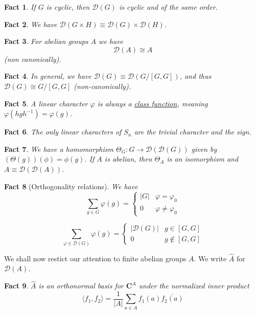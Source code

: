 \documentclass[12pt]{article}
\newtheorem*{fact*}{Fact}
\newcommand{\abs}[1]{\left\lvert#1\right\rvert}
\newcommand{\gen}[1]{\langle#1\rangle}
\newcommand{\vphi}{\varphi}
\newcommand{\C}{\mathbf{C}}
\newcommand{\DD}{\mathscr{D}}
\begin{document}
\begin{fact*}
If $G$ is cyclic, then $\DD(G)$ is cyclic and of the same order.
\end{fact*}


\begin{fact*}
We have $\DD(G\times H) \equiv \DD(G) \times \DD(H)$. 
\end{fact*} 

\begin{fact*}
For abelian groups $A$ we have \[\boxed{\DD(A) \cong A}\]
(non canonically).
\end{fact*}


\begin{fact*}
In general, we have $\DD(G) \equiv \DD(G/[G,G])$, and thus $\DD(G) \cong G/[G,G]$ (non-canonically).
\end{fact*}


\begin{fact*}
A linear character $\vphi$ is always a \underline{class function}, meaning $\vphi(hgh^{-1}) = \vphi(g)$.
\end{fact*}


\begin{fact*}
The only linear characters of $S_n$ are the trivial character and the sign.
\end{fact*}


\begin{fact*}
We have a homomorphism $\Theta_G : G\rightarrow \DD(\DD(G))$ given by $(\Theta(g))(\phi) = \phi(g)$. If $A$ is abelian, then $\Theta_A$ is an isomorphism and $A\equiv \DD(\DD(A))$.
\end{fact*}


\begin{fact*}[Orthogonality relations]
We have
\[\sum_{g\in G}\vphi(g) = \begin{cases}
    \abs{G} & \vphi=\vphi_0 \\
    0 & \vphi\neq\vphi_0
\end{cases}\]

\[\sum_{\vphi\in \DD(G)}\vphi(g) = \begin{cases}
    \abs{\DD(G)} & g\in[G,G] \\
    0 & g\not\in[G,G]
\end{cases}\]
\end{fact*}

We shall now restict our attention to finite abelian groups $A$. We write $\hat{A}$ for $\DD(A)$.


\begin{fact*}
$\hat{A}$ is an orthonormal basis for $\C^A$ under the normalized inner product \[\gen{f_1,f_2} = \dfrac{1}{\abs{A}}\sum_{a\in A}f_1(a)\overline{f_2(a)}\]
\end{fact*}
\end{document}
